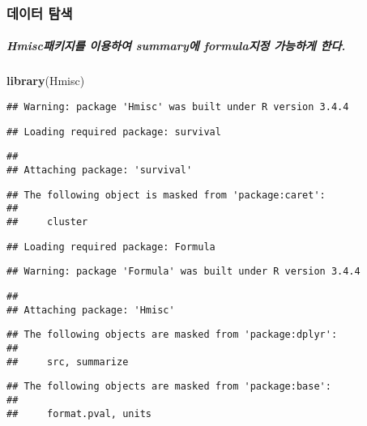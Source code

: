 \documentclass[]{article}
\newenvironment{Shaded}{\begin{snugshade}}{\end{snugshade}}
\newcommand{\KeywordTok}[1]{\textcolor[rgb]{0.13,0.29,0.53}{\textbf{#1}}}
\newcommand{\DataTypeTok}[1]{\textcolor[rgb]{0.13,0.29,0.53}{#1}}
\newcommand{\StringTok}[1]{\textcolor[rgb]{0.31,0.60,0.02}{#1}}
\newcommand{\OperatorTok}[1]{\textcolor[rgb]{0.81,0.36,0.00}{\textbf{#1}}}
\newcommand{\NormalTok}[1]{#1}
\let\oldsubparagraph\subparagraph
\renewcommand{\subparagraph}[1]{\oldsubparagraph{#1}\mbox{}}
\begin{document}
\subsubsection{데이터 탐색}\label{-}

\subparagraph{Hmisc패키지를 이용하여 summary에 formula지정 가능하게
한다.}\label{hmisc--summary-formula--.}

\begin{Shaded}
\begin{Highlighting}[]
\KeywordTok{library}\NormalTok{(Hmisc)}
\end{Highlighting}
\end{Shaded}

\begin{verbatim}
## Warning: package 'Hmisc' was built under R version 3.4.4
\end{verbatim}

\begin{verbatim}
## Loading required package: survival
\end{verbatim}

\begin{verbatim}
## 
## Attaching package: 'survival'
\end{verbatim}

\begin{verbatim}
## The following object is masked from 'package:caret':
## 
##     cluster
\end{verbatim}

\begin{verbatim}
## Loading required package: Formula
\end{verbatim}

\begin{verbatim}
## Warning: package 'Formula' was built under R version 3.4.4
\end{verbatim}

\begin{verbatim}
## 
## Attaching package: 'Hmisc'
\end{verbatim}

\begin{verbatim}
## The following objects are masked from 'package:dplyr':
## 
##     src, summarize
\end{verbatim}

\begin{verbatim}
## The following objects are masked from 'package:base':
## 
##     format.pval, units
\end{verbatim}

\begin{Shaded}
\end{Shaded}
\end{document}
